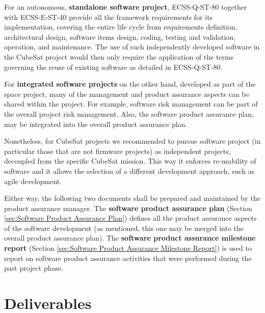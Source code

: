 For an autonomous, \textbf{standalone software project}, ECSS-Q-ST-80 together with ECSS-E-ST-40 \cite{ECSS-E-ST-40} provide all the framework requirements for its implementation, covering the entire life cycle from requirements definition, architectural design, software items design, coding, testing and validation, operation, and maintenance. The use of such independently developed software in the CubeSat project would then only require the application of the terms governing the reuse of existing software as detailed in ECSS-Q-ST-80.

For \textbf{integrated software projects} on the other hand, developed as part of the space project, many of the management and product assurance aspects can be shared within the project. For example, software risk management can be part of the overall project risk management. Also, the software product assurance plan, may be integrated into the overall product assurance plan. 

Nonetheless, for CubeSat projects we recommended to pursue software project (in particular those that are not firmware projects) as independent projects, decoupled from the specific CubeSat mission. This way it enforces re-usability of software and it allows the selection of a different development approach, such as agile development. 

Either way, the following two documents shall be prepared and maintained by the product assurance manager. The \textbf{software product assurance plan} (Section \ref{sec:Software Product Assurance Plan}) defines all the product assurance aspects of the software development (as mentioned, this one may be merged into the overall product assurance plan). The \textbf{software product assurance milestone report} (Section \ref{sec:Software Product Assurance Milestone Report}) is used to report on software product assurance activities that were performed during the past project phase.

\clearpage
\section{Deliverables}
\label{sec:Product Assurance Deliverables}

